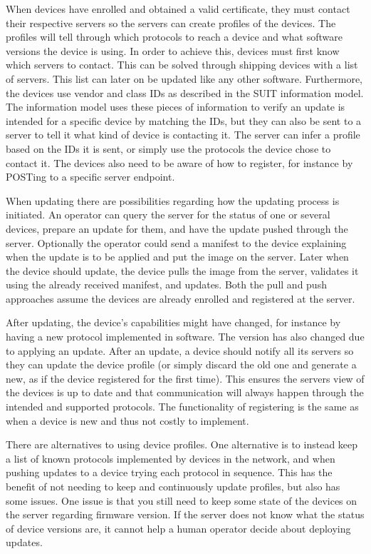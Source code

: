 \documentclass[0-thesis.tex]{subfiles}
\begin{document}
When devices have enrolled and obtained a valid certificate, they must contact their
respective servers so the servers can create profiles of the devices. The profiles will
tell through which protocols to reach a device and what software versions the device is
using. In order to achieve this, devices must first know which servers to contact. This
can be solved through shipping devices with a list of servers. This list can later on be
updated like any other software. Furthermore, the devices use vendor and class IDs as
described in the SUIT information model. The information model uses these pieces of
information to verify an update is intended for a specific device by matching the IDs, but
they can also be sent to a server to tell it what kind of device is contacting it. The
server can infer a profile based on the IDs it is sent, or simply use the protocols the
device chose to contact it. The devices also need to be aware of how to register, for
instance by POSTing to a specific server endpoint. 

When updating there are possibilities regarding how the updating process is initiated. An
operator can query the server for the status of one or several devices, prepare an update
for them, and have the update pushed through the server. Optionally the operator could
send a manifest to the device explaining when the update is to be applied and put the
image on the server. Later when the device should update, the device pulls the image from
the server, validates it using the already received manifest, and updates. Both the pull
and push approaches assume the devices are already enrolled and registered at the server.

After updating, the device's capabilities might have changed, for instance by having a new
protocol implemented in software. The version has also changed due to applying an update.
After an update, a device should notify all its servers so they can update the device
profile (or simply discard the old one and generate a new, as if the device registered for
the first time). This ensures the servers view of the devices is up to date and that
communication will always happen through the intended and supported protocols. The
functionality of registering is the same as when a device is new and thus not costly to
implement.

There are alternatives to using device profiles. One alternative is to instead keep a list
of known protocols implemented by devices in the network, and when pushing updates to a
device trying each protocol in sequence. This has the benefit of not needing to keep and
continuously update profiles, but also has some issues. One issue is that you still need
to keep some state of the devices on the server regarding firmware version. If the server
does not know what the status of device versions are, it cannot help a human operator
decide about deploying updates. 
\end{document}
